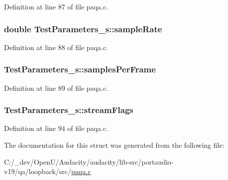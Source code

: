 Definition at line 87 of file paqa.\+c.

\subsubsection[{\texorpdfstring{sample\+Rate}{sampleRate}}]{\setlength{\rightskip}{0pt plus 5cm}double Test\+Parameters\+\_\+s\+::sample\+Rate}\hypertarget{struct_test_parameters__s_a12f734501858fdc9dcc1b7bea6fc6c03}{}\label{struct_test_parameters__s_a12f734501858fdc9dcc1b7bea6fc6c03}


Definition at line 88 of file paqa.\+c.

\subsubsection[{\texorpdfstring{samples\+Per\+Frame}{samplesPerFrame}}]{ Test\+Parameters\+\_\+s\+::samples\+Per\+Frame}\hypertarget{struct_test_parameters__s_ae0b69169e6c00794d02a8ebdea49b9d4}{}\label{struct_test_parameters__s_ae0b69169e6c00794d02a8ebdea49b9d4}


Definition at line 89 of file paqa.\+c.

\subsubsection[{\texorpdfstring{stream\+Flags}{streamFlags}}]{ Test\+Parameters\+\_\+s\+::stream\+Flags}\hypertarget{struct_test_parameters__s_ac598b23480787633ec413edf3513d489}{}\label{struct_test_parameters__s_ac598b23480787633ec413edf3513d489}


Definition at line 94 of file paqa.\+c.



The documentation for this struct was generated from the following file\+:\begin{DoxyCompactItemize}
\item 
C\+:/\+\_\+dev/\+Open\+U/\+Audacity/audacity/lib-\/src/portaudio-\/v19/qa/loopback/src/\hyperlink{paqa_8c}{paqa.\+c}\end{DoxyCompactItemize}
